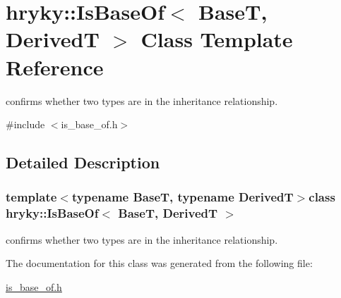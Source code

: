 \hypertarget{classhryky_1_1_is_base_of}{\section{hryky\-:\-:Is\-Base\-Of$<$ Base\-T, Derived\-T $>$ Class Template Reference}
\label{classhryky_1_1_is_base_of}
}


confirms whether two types are in the inheritance relationship.  




{\ttfamily \#include $<$is\-\_\-base\-\_\-of.\-h$>$}



\subsection{Detailed Description}
\subsubsection*{template$<$typename Base\-T, typename Derived\-T$>$class hryky\-::\-Is\-Base\-Of$<$ Base\-T, Derived\-T $>$}

confirms whether two types are in the inheritance relationship. 

The documentation for this class was generated from the following file\-:\begin{DoxyCompactItemize}
\item 
\hyperlink{is__base__of_8h}{is\-\_\-base\-\_\-of.\-h}\end{DoxyCompactItemize}
